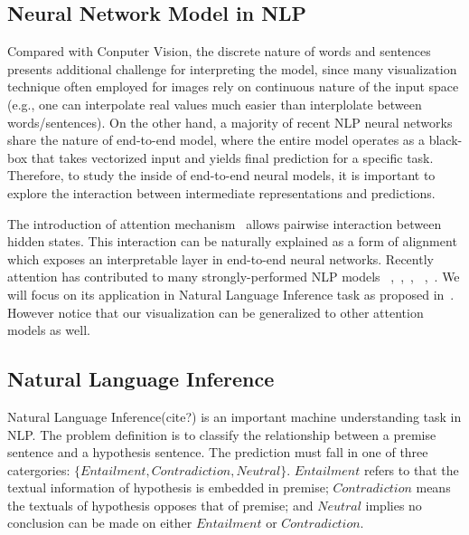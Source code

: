 \subsection{Neural Network Model in NLP}
Compared with Conputer Vision, the discrete nature of words and sentences
presents additional challenge for
interpreting the model, since many visualization technique often employed
for images rely on continuous nature of the input space (e.g., one can interpolate
real values much easier than interplolate between words/sentences).
%
On the other hand, a majority of recent NLP neural networks share the nature of
end-to-end model, where the entire model operates as a black-box that takes
vectorized input and yields final prediction for a specific task.
Therefore, to study the inside of end-to-end neural models, it is important to
explore the interaction between intermediate representations and predictions.

The introduction of attention mechanism~\cite{bahdanau2014neural} allows
pairwise interaction between hidden states. This interaction can be naturally explained
as a form of alignment which exposes an interpretable layer in end-to-end neural networks.
Recently attention has contributed to many strongly-performed NLP models
~\cite{parikh2016emnlp},~\cite{rush2015neural},~\cite{yang2016hierarchical},
~\cite{seo2016bidirectional},~\cite{schwartz2017high}.
We will focus on its application in Natural Language Inference task as proposed in~\cite{parikh2016emnlp}.
However notice that our visualization can be generalized to other attention models as well.

\subsection{Natural Language Inference}
Natural Language Inference(cite?) is an important machine understanding task in NLP.
The problem definition is to classify the relationship between a premise sentence and a hypothesis sentence.
The prediction must fall in one of three catergories: $\{Entailment, Contradiction, Neutral\}$.
$Entailment$ refers to that the textual information of hypothesis is embedded in premise;
$Contradiction$ means the textuals of hypothesis opposes that of premise;
and $Neutral$ implies no conclusion can be made on either $Entailment$ or $Contradiction$.

